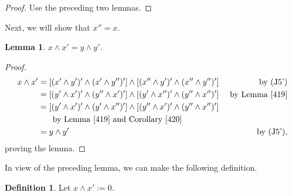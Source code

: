 \documentclass{amsart}
\theoremstyle{plain}
\newtheorem{lemma}[theorem]{Lemma}
\theoremstyle{problem}
\theoremstyle{definition}
\newtheorem{definition}[theorem]{Definition}
\theoremstyle{remark}
\numberwithin{equation}{section}
\begin{document}
\begin{proof}
     Use the preceding two lemmas.
\end{proof}

   
Next, we will show that $x''=x$.
    

\begin{lemma} \label{421}
    $x \land x'= y \land y'$.
\end{lemma}
\begin{proof}
\begin{align*}
    x \land x' 
         &=[(x' \land y')' \land (x' \land y'')'] \land [(x'' \land y')' \land (x'' \land y'')']
              & \text{  by (J5')}\\
              &=[(y' \land x')' \land (y'' \land x')'] \land [(y' \land x'' )' \land (y'' \land x'')']   
              &\text{ by Lemma \ref{419}} \\
              &=[(y' \land x')' \land (y' \land x'' )' ] \land [(y'' \land x')' \land (y'' \land x'')'] \\
              &\hspace{.5cm} \text{ by Lemma \ref{419} and 
              Corollary \ref{420}}   \\
               &=y \land y' &\text{  by (J5')},
\end{align*}
proving the lemma.
\end{proof}

In view of the preceding lemma, we can make the following definition.
\begin{definition} \label{423}
    Let $x \land x' := 0$.
\end{definition}

\end{document}
